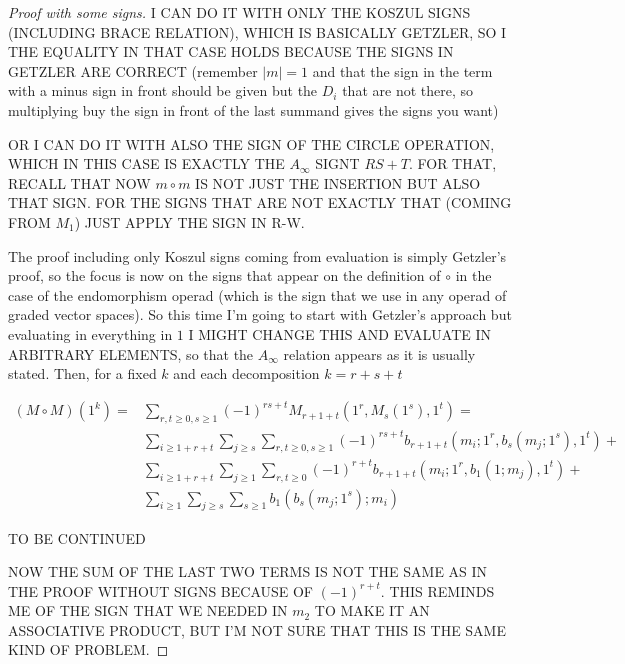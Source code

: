 \documentclass[twoside]{article}
\begin{document}
\begin{proof}[Proof with some signs]

I CAN DO IT WITH ONLY THE KOSZUL SIGNS (INCLUDING BRACE RELATION), WHICH IS BASICALLY GETZLER, SO I THE EQUALITY IN THAT CASE HOLDS BECAUSE THE SIGNS IN GETZLER ARE CORRECT (remember $|m|=1$ and that the sign in the term with a minus sign in front should be given but the $D_i$ that are not there, so multiplying buy the sign in front of the last summand gives the signs you want)

OR I CAN DO IT WITH ALSO THE SIGN OF THE CIRCLE OPERATION, WHICH IN THIS CASE IS EXACTLY THE $A_\infty$ SIGNT $RS+T$. FOR THAT, RECALL THAT NOW $m\circ m$ IS NOT JUST THE INSERTION BUT ALSO THAT SIGN. FOR THE SIGNS THAT ARE NOT EXACTLY THAT (COMING FROM $M_1$) JUST APPLY THE SIGN IN R-W. 


The proof including only Koszul signs coming from evaluation is simply Getzler's proof, so the focus is now on the signs that appear on the definition of $\circ$ in the case of the endomorphism operad (which is the sign that we use in any operad of graded vector spaces). So this time I'm going to start with Getzler's approach but evaluating in everything in $1$ I MIGHT CHANGE THIS AND EVALUATE IN ARBITRARY ELEMENTS, so that the $A_\infty$ relation appears as it is usually stated. Then, for a fixed $k$ and each decomposition $k=r+s+t$

\begin{align*}
(M\circ M)(1^k)=&\sum_{r,t\geq 0, s\geq 1}(-1)^{rs+t}M_{r+1+t}(1^{ r}, M_s(1^{s}),1^t)=\\
&\sum_{i\geq 1+r+t}\sum_{j\geq s}\sum_{r,t\geq 0, s\geq 1}(-1)^{rs+t}b_{r+1+t}(m_i;1^{ r}, b_s(m_j;1^{s}),1^t)+\\
&\sum_{i\geq 1+r+t}\sum_{j\geq 1}\sum_{r,t\geq 0}(-1)^{r+t}b_{r+1+t}(m_i;1^{r}, b_1(1;m_j),1^t)+\\
&\sum_{i\geq 1}\sum_{j\geq s}\sum_{s\geq 1}b_{1}(b_s(m_j;1^{s});m_i)
\end{align*}

TO BE CONTINUED

NOW THE SUM OF THE LAST TWO TERMS IS NOT THE SAME AS IN THE PROOF WITHOUT SIGNS BECAUSE OF $(-1)^{r+t}$. THIS REMINDS ME OF THE SIGN THAT WE NEEDED IN $m_2$ TO MAKE IT AN ASSOCIATIVE PRODUCT, BUT I'M NOT SURE THAT THIS IS THE SAME KIND OF PROBLEM.


\end{proof}
\end{document}
